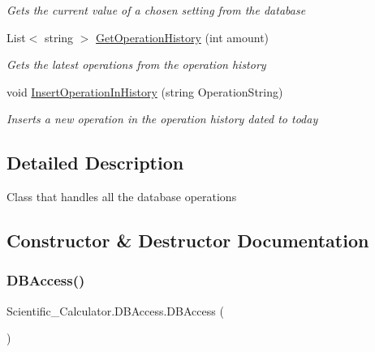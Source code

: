 \begin{DoxyCompactItemize}
\begin{DoxyCompactList}\small\item\em Gets the current value of a chosen setting from the database \end{DoxyCompactList}\item 
List$<$ string $>$ \hyperlink{class_scientific___calculator_1_1_d_b_access_a0082501ed3f21914f17be60e4a7541b3}{Get\+Operation\+History} (int amount)
\begin{DoxyCompactList}\small\item\em Gets the latest operations from the operation history \end{DoxyCompactList}\item 
void \hyperlink{class_scientific___calculator_1_1_d_b_access_a9bfbf5393338345c6d5b41cb43fbc56b}{Insert\+Operation\+In\+History} (string Operation\+String)
\begin{DoxyCompactList}\small\item\em Inserts a new operation in the operation history dated to today \end{DoxyCompactList}\end{DoxyCompactItemize}


\subsection{Detailed Description}
Class that handles all the database operations 



\subsection{Constructor \& Destructor Documentation}
\mbox{\label{class_scientific___calculator_1_1_d_b_access_a6007d654070f5893e1876c19e1740a5c}} 
\subsubsection{\texorpdfstring{D\+B\+Access()}{DBAccess()}}
{\footnotesize\ttfamily Scientific\+\_\+\+Calculator.\+D\+B\+Access.\+D\+B\+Access (\begin{DoxyParamCaption}{ }\end{DoxyParamCaption})}



